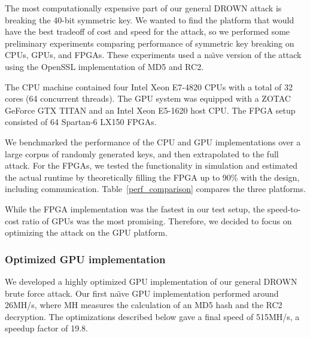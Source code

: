 
The most computationally expensive part of our general DROWN attack is breaking the 40-bit symmetric key.  We wanted to find the platform that would have the best tradeoff of cost and speed for the attack, so we performed some preliminary experiments comparing performance of symmetric key breaking on CPUs, GPUs, and FPGAs.  These experiments used a na\"{\i}ve version of the attack using the OpenSSL implementation of MD5 and RC2.

The CPU machine contained four Intel Xeon E7-4820 CPUs with a total of 32 cores (64 concurrent threads). The GPU system was equipped with a ZOTAC GeForce GTX TITAN and an Intel Xeon E5-1620 host CPU\@. The FPGA setup consisted of 64 Spartan-6 LX150 FPGAs.

We benchmarked the performance of the CPU and GPU implementations over a large corpus of randomly generated keys, and then extrapolated to the full attack.
For the FPGAs, we tested the functionality in simulation and estimated the actual runtime by theoretically filling the FPGA up to 90\% with the design, including communication.
Table~\ref{perf_comparison} compares the three platforms.

While the FPGA implementation was the fastest in our test setup, the speed-to-cost ratio of GPUs was the most promising. Therefore, we decided to focus on optimizing the attack on the GPU platform.
\fi

\ifext
\subsubsection{Optimized GPU implementation}
\label{sec:gpu_brief}
We developed a highly optimized GPU implementation of our general DROWN brute force attack.  Our first na\"{\i}ve GPU implementation performed around 26MH/s, where MH measures the calculation of an MD5 hash and the RC2 decryption. The optimizations described below gave a final speed of 515MH/s, a speedup factor of 19.8.  
\fi

